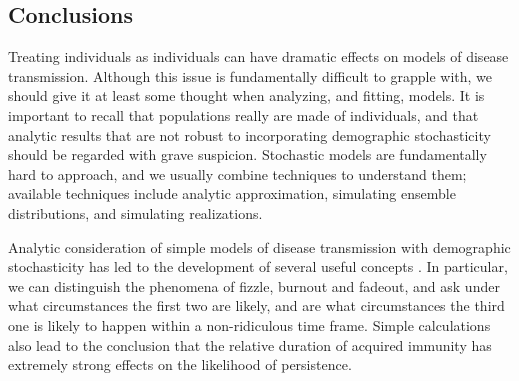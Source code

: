 \documentclass{amsproc}
\theoremstyle{definition}
\theoremstyle{remark}
\numberwithin{equation}{section}
\begin{document}
\subsection{Conclusions}

Treating individuals as individuals can have dramatic effects on models of disease transmission. 
Although this issue is fundamentally difficult to grapple with, we should give it at least some thought when analyzing, and fitting, models.
It is important to recall that populations really are made of individuals, and that analytic results that are not robust to incorporating demographic stochasticity should be regarded with grave suspicion.
Stochastic models are fundamentally hard to approach, and we usually combine techniques to understand them;
available techniques  include analytic approximation, simulating ensemble distributions, and simulating realizations. 

Analytic consideration of simple models of disease transmission with demographic stochasticity has led to the development of several useful concepts .
In particular, we can distinguish the phenomena of fizzle, burnout and fadeout, and ask under what circumstances the first two are likely, and are what circumstances the third one is likely to happen within a non-ridiculous time frame.
Simple calculations also lead to the conclusion that the relative duration of acquired immunity has extremely strong effects on the likelihood of persistence. 



\end{document}
